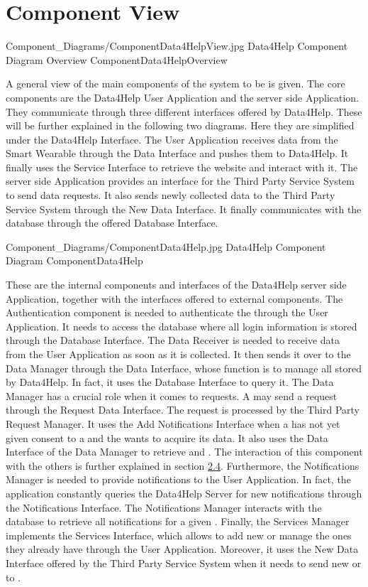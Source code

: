 \documentclass[../../DD.tex]{subfiles}
\begin{document}
\section{Component View}

	\image {13cm} {Component_Diagrams/ComponentData4HelpView.jpg} {Data4Help Component Diagram Overview} {ComponentData4HelpOverview}

	A general view of the main components of the system to be is given. The core components are the Data4Help User Application and the server side Application. They communicate through three different interfaces offered by Data4Help. These will be further explained in the following two diagrams. Here they are simplified under the Data4Help Interface. The User Application receives data from the Smart Wearable through the Data Interface and pushes them to Data4Help. It finally uses the Service Interface to retrieve the  website and interact with it.
	The server side Application provides an interface for the Third Party Service System to send data requests. It also sends newly collected data to the Third Party Service System through the New Data Interface. It finally communicates with the database through the offered Database Interface.

	\image {13cm} {Component_Diagrams/ComponentData4Help.jpg} {Data4Help Component Diagram} {ComponentData4Help}

	These are the internal components and interfaces of the Data4Help server side Application, together with the interfaces offered to external components.
	The Authentication component is needed to authenticate the  through the User Application. It needs to access the database where all login information is stored through the Database Interface.
	The Data Receiver is needed to receive data from the User Application as soon as it is collected. It then sends it over to the Data Manager through the Data Interface, whose function is to manage all  stored by Data4Help. In fact, it uses the Database Interface to query it.
	The Data Manager has a crucial role when it comes to  requests. A  may send a request through the Request Data Interface. The request is processed by the Third Party Request Manager. It uses the Add Notifications Interface when a  has not yet given consent to a  and the  wants to acquire its data. It also uses the Data Interface of the Data Manager to retrieve  and . The interaction of this component with the others is further explained in section \hyperref[sect:2.4]{2.4}.
	Furthermore, the Notifications Manager is needed to provide notifications to the User Application. In fact, the application constantly queries the Data4Help Server for new notifications through the Notifications Interface. The Notifications Manager interacts with the database to retrieve all notifications for a given .
	Finally, the Services Manager implements the Services Interface, which allows  to add new  or manage the ones they already have through the User Application. Moreover, it uses the New Data Interface offered by the Third Party Service System when it needs to send new  or  to .
\end{document}
